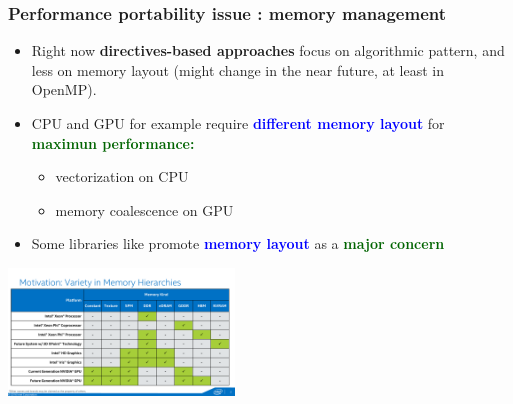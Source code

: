 \begin{frame}
  \frametitle{Performance portability issue : memory management}

  \begin{itemize}
  \item Right now \textbf{directives-based approaches} focus on algorithmic pattern, and less on memory layout (might change in the near future, at least in OpenMP).
  \item CPU and GPU for example require \textcolor{blue}{\textbf{different memory layout}} for \textcolor{darkgreen}{\textbf{maximun performance:}}
    \begin{itemize}
    \item vectorization on CPU
    \item memory coalescence on GPU
    \end{itemize}
  \item Some libraries like  promote \textcolor{blue}{\textbf{memory layout}} as a \textcolor{darkgreen}{\textbf{major concern}}
  \end{itemize}

  \begin{center}
    \includegraphics[width=6cm]{doc/openmp/omp_memory}
  \end{center}


\end{frame}

